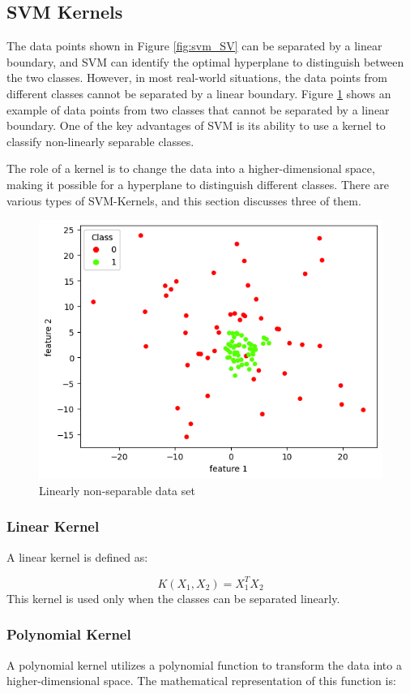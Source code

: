 \subsection{SVM Kernels}
The data points shown in Figure \ref{fig:svm_SV} can be separated by a linear boundary, and SVM can identify the optimal hyperplane to distinguish between the two classes. However, in most real-world situations, the data points from different classes cannot be separated by a linear boundary. Figure \ref{fig:svm_K} shows an example of data points from two classes that cannot be separated by a linear boundary. One of the key advantages of SVM is its ability to use a kernel to classify non-linearly separable classes.

The role of a kernel is to change the data into a higher-dimensional space, making it possible for a hyperplane to distinguish different classes. There are various types of SVM-Kernels, and this section discusses three of them.

\begin{figure}[!h]
  \centering
  \includegraphics[width=8 cm]{svm_kernel.png}
  \caption{Linearly non-separable data set}
  \label{fig:svm_K}
\end{figure}

\newpage
\subsubsection{\textbf{Linear Kernel}}
A linear kernel is defined as:

\begin{equation}\label{eq:lin_kernel}
  K(X_1, X_2) = X_1^T X_2
\end{equation}This kernel is used only when the classes can be separated linearly.

\subsubsection{\textbf{Polynomial Kernel}}
A polynomial kernel utilizes a polynomial function to transform the data into a higher-dimensional space. The mathematical representation of this function is:

